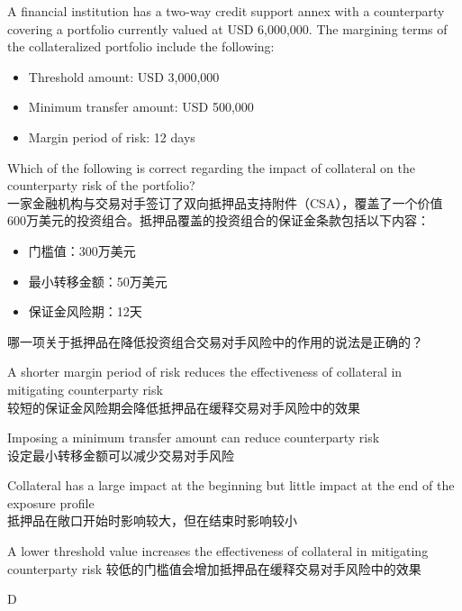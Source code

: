 \documentclass{article}
\newcounter{question} %
\begin{document}
\begin{question}
    A financial institution has a two-way credit support annex with a counterparty covering a portfolio currently valued at USD 6,000,000. The margining terms of the collateralized portfolio include the following:
    \begin{itemize}
        \item Threshold amount: USD 3,000,000
        \item Minimum transfer amount: USD 500,000
        \item Margin period of risk: 12 days
    \end{itemize}
    Which of the following is correct regarding the impact of collateral on the counterparty risk of the portfolio?
    \\ 一家金融机构与交易对手签订了双向抵押品支持附件（CSA），覆盖了一个价值600万美元的投资组合。抵押品覆盖的投资组合的保证金条款包括以下内容：
    \begin{itemize}
        \item 门槛值：300万美元
        \item 最小转移金额：50万美元
        \item 保证金风险期：12天
    \end{itemize}
    哪一项关于抵押品在降低投资组合交易对手风险中的作用的说法是正确的？
\end{question}

\begin{choices}
    \item A shorter margin period of risk reduces the effectiveness of collateral in mitigating counterparty risk\\
    较短的保证金风险期会降低抵押品在缓释交易对手风险中的效果
    \item Imposing a minimum transfer amount can reduce counterparty risk\\
    设定最小转移金额可以减少交易对手风险
    \item Collateral has a large impact at the beginning but little impact at the end of the exposure profile\\
    抵押品在敞口开始时影响较大，但在结束时影响较小
    \item A lower threshold value increases the effectiveness of collateral in mitigating counterparty risk
    较低的门槛值会增加抵押品在缓释交易对手风险中的效果
\end{choices}

\begin{correctanswer}
    D
\end{correctanswer}
\end{document}
